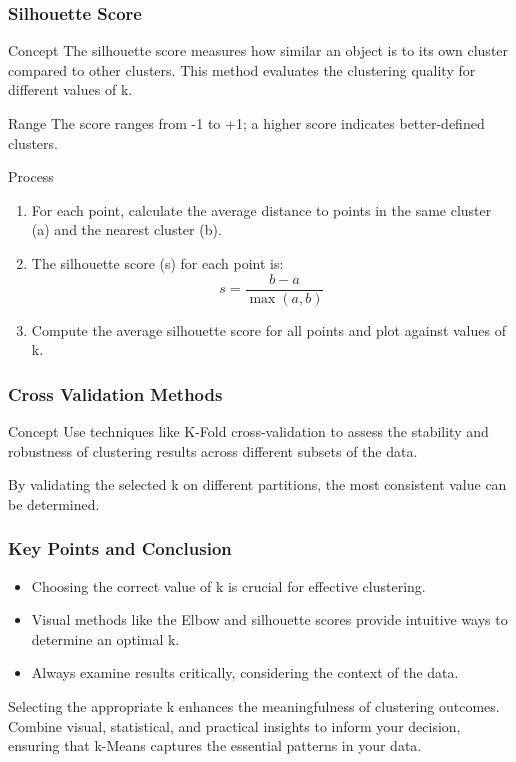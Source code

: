 \documentclass[aspectratio=169]{beamer}
\begin{document}
\begin{frame}[fragile]
  \frametitle{Silhouette Score}
  \begin{block}{Concept}
    The silhouette score measures how similar an object is to its own cluster compared to other clusters. This method evaluates the clustering quality for different values of k.
  \end{block}
  \begin{block}{Range}
    The score ranges from -1 to +1; a higher score indicates better-defined clusters.
  \end{block}
  \begin{block}{Process}
    \begin{enumerate}
      \item For each point, calculate the average distance to points in the same cluster (a) and the nearest cluster (b).
      \item The silhouette score (s) for each point is:
      \begin{equation}
        s = \frac{b - a}{\max(a, b)}
      \end{equation}
      \item Compute the average silhouette score for all points and plot against values of k.
    \end{enumerate}
  \end{block}
\end{frame}

\begin{frame}[fragile]
  \frametitle{Cross Validation Methods}
  \begin{block}{Concept}
    Use techniques like K-Fold cross-validation to assess the stability and robustness of clustering results across different subsets of the data.
  \end{block}
  By validating the selected k on different partitions, the most consistent value can be determined.
\end{frame}

\begin{frame}[fragile]
  \frametitle{Key Points and Conclusion}
  \begin{itemize}
    \item Choosing the correct value of k is crucial for effective clustering.
    \item Visual methods like the Elbow and silhouette scores provide intuitive ways to determine an optimal k.
    \item Always examine results critically, considering the context of the data.
  \end{itemize}
  
  Selecting the appropriate k enhances the meaningfulness of clustering outcomes. Combine visual, statistical, and practical insights to inform your decision, ensuring that k-Means captures the essential patterns in your data.
\end{frame}
\end{document}

